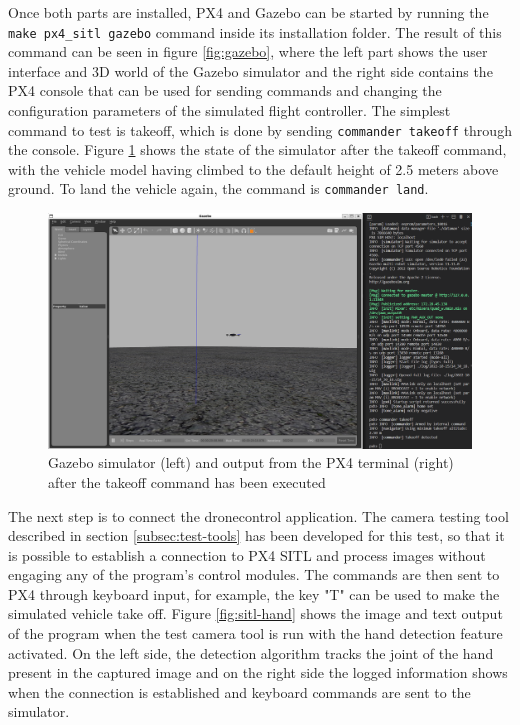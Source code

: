 Once both parts are installed, PX4 and Gazebo can be started by running the \texttt{make px4_sitl gazebo} command inside its installation folder.
The result of this command can be seen in figure \ref{fig:gazebo}, where the left part shows the user interface and 3D world of the Gazebo simulator and the right side contains the PX4 console that can be used for sending commands and changing the configuration parameters of the simulated flight controller.
The simplest command to test is takeoff, which is done by sending \texttt{commander takeoff} through the console.
Figure \ref{fig:gazebo-takeoff} shows the state of the simulator after the takeoff command, with the vehicle model having climbed to the default height of 2.5 meters above ground.
To land the vehicle again, the command is \texttt{commander land}.

\begin{figure}
  \centering
  \includegraphics[width=.8\textwidth, keepaspectratio]{img/gazebo-takeoff.png}
  \caption{Gazebo simulator (left) and output from the PX4 terminal (right) after the takeoff command has been executed}\label{fig:gazebo-takeoff}
\end{figure}

The next step is to connect the dronecontrol application.
The camera testing tool described in section \ref{subsec:test-tools} has been developed for this test, so that it is possible to establish a connection to PX4 SITL and process images without engaging any of the program's control modules.
The commands are then sent to PX4 through keyboard input, for example, the key "T" can be used to make the simulated vehicle take off.
Figure \ref{fig:sitl-hand} shows the image and text output of the program when the test camera tool is run with the hand detection feature activated.
On the left side, the detection algorithm tracks the joint of the hand present in the captured image and on the right side the logged information shows when the connection is established and keyboard commands are sent to the simulator.

